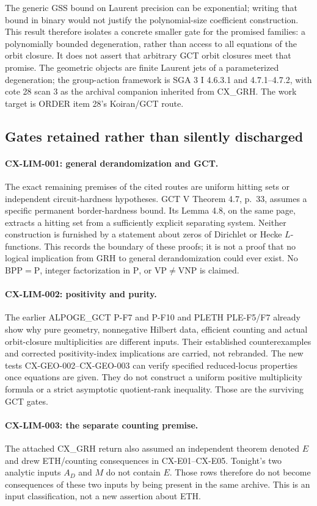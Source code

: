 The generic GSS bound on Laurent precision can be exponential; writing
that bound in binary would not justify the polynomial-size coefficient
construction. This result therefore isolates a concrete smaller gate for
the promised families: a polynomially bounded degeneration, rather than
access to all equations of the orbit closure. It does not assert that
arbitrary GCT orbit closures meet that promise. The geometric objects are
finite Laurent jets of a parameterized degeneration; the group-action
framework is SGA 3 I 4.6.3.1 and 4.7.1--4.7.2, with cote 28 scan 3 as the
archival companion inherited from CX\_GRH. The work target is ORDER item
28's Koiran/GCT route.

\subsection{Gates retained rather than silently discharged}

\paragraph{CX-LIM-001: general derandomization and GCT.}
The exact remaining premises of the cited routes are uniform hitting sets
or independent circuit-hardness hypotheses. GCT V Theorem 4.7, p.~33,
assumes a specific permanent border-hardness bound. Its Lemma 4.8, on the
same page, extracts a hitting set from a sufficiently explicit separating
system. Neither construction is furnished by a statement about zeros of
Dirichlet or Hecke $L$-functions. This records the boundary of these proofs;
it is not a proof that no logical implication from GRH to general
derandomization could ever exist. No $\mathrm{BPP}=\mathrm P$, integer
factorization in $\mathrm P$, or $\mathrm{VP}\ne\mathrm{VNP}$ is claimed.

\paragraph{CX-LIM-002: positivity and purity.}
The earlier ALPOGE\_GCT P-F7 and P-F10 and PLETH PLE-F5/F7 already show
why pure geometry, nonnegative Hilbert data, efficient counting and actual
orbit-closure multiplicities are different inputs. Their established
counterexamples and corrected positivity-index implications are carried,
not rebranded. The new tests CX-GEO-002--CX-GEO-003 can verify specified
reduced-locus properties once equations are given. They do not construct a
uniform positive multiplicity formula or a strict asymptotic quotient-rank
inequality. Those are the surviving GCT gates.

\paragraph{CX-LIM-003: the separate counting premise.}
The attached CX\_GRH return also assumed an independent theorem denoted
$E$ and drew ETH/counting consequences in CX-E01--CX-E05. Tonight's two
analytic inputs $A_D$ and $M$ do not contain $E$. Those rows therefore do
not become consequences of these two inputs by being present in the same
archive. This is an input classification, not a new assertion about ETH.

